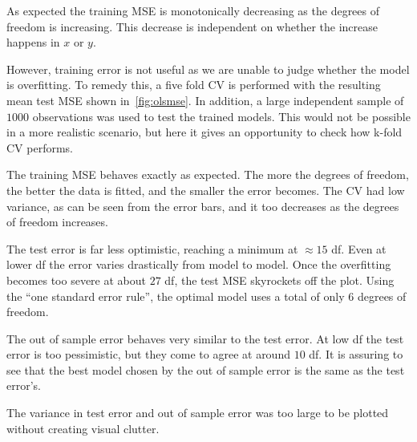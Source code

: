 As expected the training MSE is monotonically decreasing as the degrees of
freedom is increasing. This decrease is independent on whether the increase
happens in \(x\) or \(y\).

However, training error is not useful as we are unable to judge whether the
model is overfitting. To remedy this, a five fold CV is performed with the
resulting mean test MSE shown in~\cref{fig:olsmse}. In addition,  a large independent sample of
\(1000\) observations was used to test the trained models. This would not be
possible in a more realistic scenario, but here it gives an opportunity to check
how k-fold CV performs.

The training MSE behaves exactly as expected. The more the degrees of freedom,
the better the data is fitted, and the smaller the error becomes. The CV had low
variance, as can be seen from the error bars, and it too decreases as the
degrees of freedom increases.

The test error is far less optimistic, reaching a minimum at \(\approx 15\) df.
Even at lower df the error varies drastically from model to model. Once the
overfitting becomes too severe at about \(27\) df, the test MSE skyrockets off
the plot. Using the ``one standard error rule'', the optimal model uses a total
of only \(6\) degrees of freedom.

The out of sample error behaves very similar to the test error. At low df the
test error is too pessimistic, but they come to agree at around \(10\) df.
It is assuring to see that the best model chosen by the out of sample error is
the same as the test error's. 

The variance in test error and out of sample error was too large to be plotted
without creating visual clutter.

